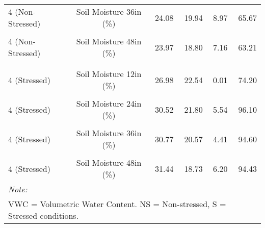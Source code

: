 \begin{table}[!h]
{\begin{tabular}[t]{lcrrrr}
\hspace{1em}4 (Non-Stressed) & Soil Moisture 36in (\%) & 24.08 & 19.94 & 8.97 & 65.67\\
\hspace{1em}\cellcolor{gray!10}{4 (Non-Stressed)} & \cellcolor{gray!10}{Soil Moisture 42in (\%)} & \cellcolor{gray!10}{21.55} & \cellcolor{gray!10}{15.71} & \cellcolor{gray!10}{7.38} & \cellcolor{gray!10}{53.85}\\
\hspace{1em}4 (Non-Stressed) & Soil Moisture 48in (\%) & 23.97 & 18.80 & 7.16 & 63.21\\
\addlinespace[0.3em]
\multicolumn{6}{l}{\textbf{4 (Stressed)}}\\
\hspace{1em}\cellcolor{gray!10}{4 (Stressed)} & \cellcolor{gray!10}{Soil Moisture 6in (\%)} & \cellcolor{gray!10}{30.06} & \cellcolor{gray!10}{17.37} & \cellcolor{gray!10}{4.22} & \cellcolor{gray!10}{67.06}\\
\hspace{1em}4 (Stressed) & Soil Moisture 12in (\%) & 26.98 & 22.54 & 0.01 & 74.20\\
\hspace{1em}\cellcolor{gray!10}{4 (Stressed)} & \cellcolor{gray!10}{Soil Moisture 18in (\%)} & \cellcolor{gray!10}{30.97} & \cellcolor{gray!10}{19.96} & \cellcolor{gray!10}{4.31} & \cellcolor{gray!10}{95.58}\\
\hspace{1em}4 (Stressed) & Soil Moisture 24in (\%) & 30.52 & 21.80 & 5.54 & 96.10\\
\hspace{1em}\cellcolor{gray!10}{4 (Stressed)} & \cellcolor{gray!10}{Soil Moisture 30in (\%)} & \cellcolor{gray!10}{33.09} & \cellcolor{gray!10}{24.28} & \cellcolor{gray!10}{4.73} & \cellcolor{gray!10}{97.47}\\
\hspace{1em}4 (Stressed) & Soil Moisture 36in (\%) & 30.77 & 20.57 & 4.41 & 94.60\\
\hspace{1em}\cellcolor{gray!10}{4 (Stressed)} & \cellcolor{gray!10}{Soil Moisture 42in (\%)} & \cellcolor{gray!10}{36.13} & \cellcolor{gray!10}{23.26} & \cellcolor{gray!10}{2.24} & \cellcolor{gray!10}{88.81}\\
\hspace{1em}4 (Stressed) & Soil Moisture 48in (\%) & 31.44 & 18.73 & 6.20 & 94.43\\
\bottomrule
\multicolumn{6}{l}{\rule{0pt}{1em}\textit{Note:}}\\
\multicolumn{6}{l}{\rule{0pt}{1em}VWC = Volumetric Water Content. NS = Non-stressed, S = Stressed conditions.}\\
\end{tabular}}
\end{table}
